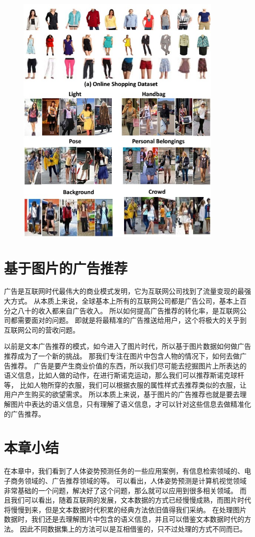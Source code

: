 \begin{figure}
\centering
\includegraphics[width=0.9\textwidth]{img/map.jpg}
\label{fig:attr-cloth}
\end{figure}

\section{基于图片的广告推荐}
广告是互联网时代最伟大的商业模式发明，它为互联网公司找到了流量变现的最强大方式。
从本质上来说，全球基本上所有的互联网公司都是广告公司，基本上百分之八十的收入都来自广告收入。
所以如何提高广告推荐的转化率，是互联网公司都需要面对的问题。
即就是将最精准的广告推送给用户，这个将极大的关乎到互联网公司的营收问题。


以前是文本广告推荐的模式，如今进入了图片时代，所以基于图片数据如何做广告推荐成为了一个新的挑战。
那我们专注在图片中包含人物的情况下，如何去做广告推荐。
广告是要产生商业价值的东西，所以我们尽可能去挖掘图片上所表达的语义信息，比如人做的动作，在进行斯诺克运动，那么我们可以推荐斯诺克球杆等，
比如人物所穿的衣服，我们可以根据衣服的属性样式去推荐类似的衣服，让用户产生购买的欲望需求。
所以本质上来说，基于图片的广告推荐也就是要去理解图片中表达的语义信息，只有理解了语义信息，才可以针对这些信息去做精准化的广告推荐。


\section{本章小结}
在本章中，我们看到了人体姿势预测任务的一些应用案例，有信息检索领域的、电子商务领域的、广告推荐领域的等。
可以看出，人体姿势预测是计算机视觉领域非常基础的一个问题，解决好了这个问题，那么就可以应用到很多相关领域。
而且我们可以看出，随着互联网的发展，文本数据的方式已经慢慢成熟，而图片时代将慢慢到来，但是文本数据时代积累的经典方法依旧值得我们采纳。
在处理图片数据时，我们还是去理解图片中包含的语义信息，并且可以借鉴文本数据时代的方法。
因此不同数据集上的方法可以是互相借鉴的，只不过处理的方式不同而已。
